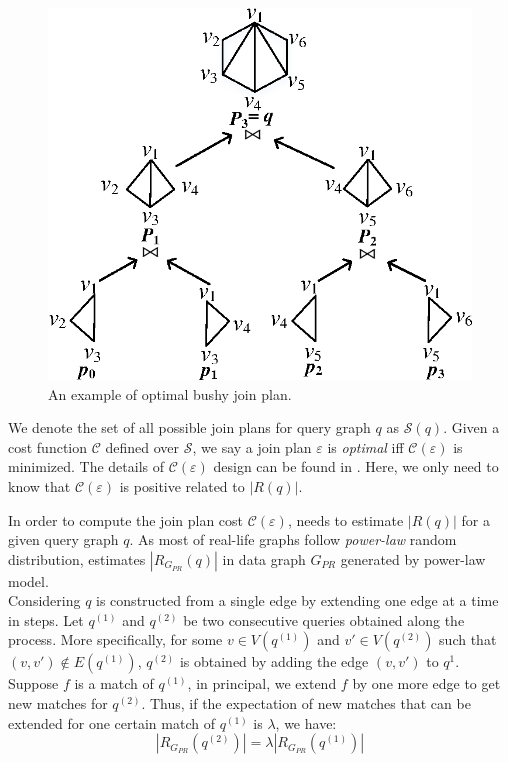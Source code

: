 \begin{figure}[htb]
  \centering
  \includegraphics[scale=0.6]{figures/tree.eps}
  \caption{\small{An example of optimal bushy join plan.}}
  \label{fig:tree}
\end{figure}

We denote the set of all possible join plans for query graph $q$ as $\mathcal{S}(q)$. Given a cost function $\mathcal{C}$ defined over $\mathcal{S}$, we say a join plan $\varepsilon$ is \textit{optimal} iff $\mathcal{C}(\varepsilon)$ is minimized. The details of $\mathcal{C}(\varepsilon)$ design can be found in \cite{Lai2016}. Here, we only need to know that $\mathcal{C}(\varepsilon)$ is positive related to $|R(q)|$.

 In order to compute the join plan cost  $\mathcal{C}(\varepsilon)$, \cliquejoin needs to estimate $|R(q)|$ for a given query graph $q$. As most of real-life graphs follow \textit{power-law} random distribution\cite{Chung2003}, \cliquejoin estimates $|R_{G_{PR}}(q)|$ in data graph $G_{PR}$ generated by power-law model.\\

Considering $q$ is constructed from a single edge by extending one edge at a time in steps. Let $q^{(1)}$ and $q^{(2)}$ be two consecutive queries obtained along the process. More specifically, for some $v\in V(q^{(1)})$ and $v'\in V(q^{(2)})$ such that  $(v,v')\not\in E(q^{(1)})$, $q^{(2)}$ is obtained by adding the edge $(v,v')$ to $q^{1}$. Suppose $f$ is a match of $q^{(1)}$, in principal, we extend $f$ by one more edge to get new matches for $q^{(2)}$. Thus, if the expectation of new matches that can be extended for one certain match of $q^{(1)}$ is $\lambda$, we have:
\begin{equation} \label{eq:r}
|R_{G_{PR}}(q^{(2)})|=\lambda |R_{G_{PR}}(q^{(1)})|
\end{equation}

